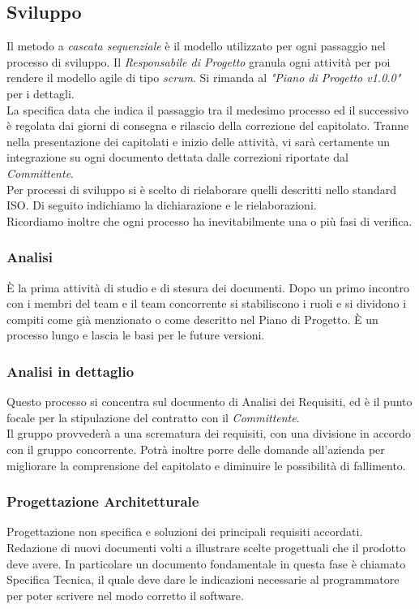 \documentclass[12pt,a4paper,titlepage]{article}
\begin{document}
\subsection{Sviluppo}
Il metodo a \textit{cascata sequenziale} è il modello utilizzato per ogni passaggio nel processo di sviluppo. Il \textit{Responsabile di Progetto} granula ogni attività per poi rendere il modello agile di tipo \textit{scrum}. Si rimanda al \textit{"Piano di Progetto v1.0.0"} per i dettagli.\\
La specifica data che indica il passaggio tra il medesimo processo ed il successivo è regolata dai giorni di consegna e rilascio della correzione del capitolato. Tranne nella presentazione dei capitolati e inizio delle attività, vi sarà certamente un integrazione su ogni documento dettata dalle correzioni riportate dal \textit{Committente}.\\
Per processi di sviluppo si è scelto di rielaborare quelli descritti nello standard ISO. Di seguito indichiamo la dichiarazione e le rielaborazioni.\\
Ricordiamo inoltre che ogni processo ha inevitabilmente una o più fasi di verifica.
\subsubsection{Analisi}
È la prima attività di studio e di stesura dei documenti. Dopo un primo incontro con i membri del team e il team concorrente si stabiliscono i ruoli e si dividono i compiti come già menzionato o come descritto nel Piano di Progetto. È un processo lungo e lascia le basi per le future versioni.
\subsubsection{Analisi in dettaglio}
Questo processo si concentra sul documento di Analisi dei Requisiti, ed è il punto focale per la stipulazione del contratto con il \textit{Committente}. \\Il gruppo provvederà a una scrematura dei requisiti, con una divisione in accordo con il gruppo concorrente. Potrà inoltre porre delle domande all'azienda per migliorare la comprensione del capitolato e diminuire le possibilità di fallimento.
\subsubsection{Progettazione Architetturale} 
Progettazione non specifica e soluzioni dei principali requisiti accordati. \\ Redazione di nuovi documenti volti a illustrare scelte progettuali che il prodotto deve avere. In particolare un documento fondamentale in questa fase è chiamato Specifica Tecnica, il quale deve dare le indicazioni necessarie al programmatore per poter scrivere nel modo corretto il software. 
\end{document}
